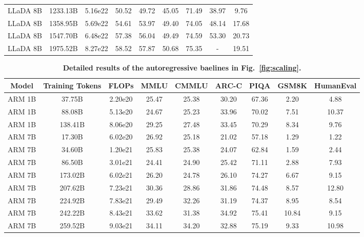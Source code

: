 \documentclass{article}
\begin{document}
\begin{table}[t!]
\begin{adjustbox}{max width=\textwidth}
\begin{tabular}{ccc|cccccc}
    LLaDA 8B & 1233.13B & 5.16e22 & 50.52 & 49.72 & 45.05 & 71.49 & 38.97 & 9.76 \\
    LLaDA 8B & 1358.95B & 5.69e22 & 54.61 & 53.97 & 49.40 & 74.05 & 48.14 & 17.68 \\
    LLaDA 8B & 1547.70B & 6.48e22 & 57.38 & 56.04 & 49.49 & 74.59 & 53.30 & 20.73 \\
    LLaDA 8B & 1975.52B & 8.27e22 & 58.52 & 57.87 & 50.68 & 75.35 & - & 19.51 \\
    \bottomrule     
    \end{tabular}
    \end{adjustbox}
    \vspace{-.2cm}
\end{table}

\begin{table}[t!]
    \centering 
    \caption{\textbf{Detailed results of the autoregressive baelines in Fig.~\ref{fig:scaling}.}}
    \label{tab:scaling_arm}
    \vspace{0.2cm}
    \begin{adjustbox}{max width=\textwidth}
    \begin{tabular}{ccc|cccccc}
    \toprule
    Model & Training Tokens & FLOPs & MMLU & CMMLU & ARC-C & PIQA & GSM8K & HumanEval \\
    \midrule
    ARM 1B & 37.75B & 2.20e20 & 25.47 & 25.38 & 30.20 & 67.36 & 2.20 & 4.88 \\
    ARM 1B & 88.08B & 5.13e20 & 24.67 & 25.23 & 33.96 & 70.02 & 7.51 & 10.37 \\
    ARM 1B & 138.41B & 8.06e20 & 29.25 & 27.48 & 33.45 & 70.29 & 8.34 & 9.76 \\
    ARM 7B & 17.30B & 6.02e20 & 26.92 & 25.18 & 21.02 & 57.18 & 1.29 & 1.22 \\
    ARM 7B & 34.60B & 1.20e21 & 25.83 & 25.38 & 24.07 & 62.84 & 1.59 & 2.44 \\
    ARM 7B & 86.50B & 3.01e21 & 24.41 & 24.90 & 25.42 & 71.11 & 2.88 & 7.93 \\
    ARM 7B & 173.02B & 6.02e21 & 26.20 & 24.78 & 26.10 & 74.27 & 6.67 & 9.15 \\
    ARM 7B & 207.62B & 7.23e21 & 30.36 & 28.86 & 31.86 & 74.48 & 8.57 & 12.80 \\
    ARM 7B & 224.92B & 7.83e21 & 29.49 & 32.26 & 31.19 & 74.37 & 8.95 & 8.54 \\
    ARM 7B & 242.22B & 8.43e21 & 33.62 & 31.38 & 34.92 & 75.41 & 10.84 & 9.15 \\
    ARM 7B & 259.52B & 9.03e21 & 34.11 & 34.20 & 32.88 & 75.19 & 9.33 & 10.98 \\

\end{tabular}
\end{adjustbox}
\end{table}
\end{document}
